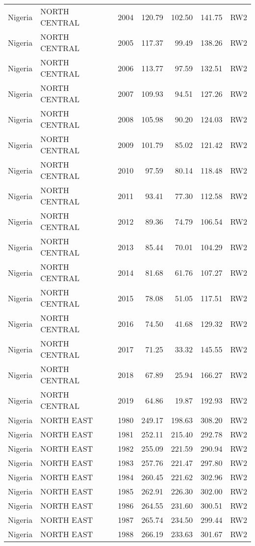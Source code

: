 \begin{longtable}{lllrrrl}
  Nigeria & NORTH CENTRAL & 2004 & 120.79 & 102.50 & 141.75 & RW2 \\ 
  Nigeria & NORTH CENTRAL & 2005 & 117.37 & 99.49 & 138.26 & RW2 \\ 
  Nigeria & NORTH CENTRAL & 2006 & 113.77 & 97.59 & 132.51 & RW2 \\ 
  Nigeria & NORTH CENTRAL & 2007 & 109.93 & 94.51 & 127.26 & RW2 \\ 
  Nigeria & NORTH CENTRAL & 2008 & 105.98 & 90.20 & 124.03 & RW2 \\ 
  Nigeria & NORTH CENTRAL & 2009 & 101.79 & 85.02 & 121.42 & RW2 \\ 
  Nigeria & NORTH CENTRAL & 2010 & 97.59 & 80.14 & 118.48 & RW2 \\ 
  Nigeria & NORTH CENTRAL & 2011 & 93.41 & 77.30 & 112.58 & RW2 \\ 
  Nigeria & NORTH CENTRAL & 2012 & 89.36 & 74.79 & 106.54 & RW2 \\ 
  Nigeria & NORTH CENTRAL & 2013 & 85.44 & 70.01 & 104.29 & RW2 \\ 
  Nigeria & NORTH CENTRAL & 2014 & 81.68 & 61.76 & 107.27 & RW2 \\ 
  Nigeria & NORTH CENTRAL & 2015 & 78.08 & 51.05 & 117.51 & RW2 \\ 
  Nigeria & NORTH CENTRAL & 2016 & 74.50 & 41.68 & 129.32 & RW2 \\ 
  Nigeria & NORTH CENTRAL & 2017 & 71.25 & 33.32 & 145.55 & RW2 \\ 
  Nigeria & NORTH CENTRAL & 2018 & 67.89 & 25.94 & 166.27 & RW2 \\ 
  Nigeria & NORTH CENTRAL & 2019 & 64.86 & 19.87 & 192.93 & RW2 \\ 
  Nigeria & NORTH EAST & 1980 & 249.17 & 198.63 & 308.20 & RW2 \\ 
  Nigeria & NORTH EAST & 1981 & 252.11 & 215.40 & 292.78 & RW2 \\ 
  Nigeria & NORTH EAST & 1982 & 255.09 & 221.59 & 290.94 & RW2 \\ 
  Nigeria & NORTH EAST & 1983 & 257.76 & 221.47 & 297.80 & RW2 \\ 
  Nigeria & NORTH EAST & 1984 & 260.45 & 221.62 & 302.96 & RW2 \\ 
  Nigeria & NORTH EAST & 1985 & 262.91 & 226.30 & 302.00 & RW2 \\ 
  Nigeria & NORTH EAST & 1986 & 264.55 & 231.60 & 300.51 & RW2 \\ 
  Nigeria & NORTH EAST & 1987 & 265.74 & 234.50 & 299.44 & RW2 \\ 
  Nigeria & NORTH EAST & 1988 & 266.19 & 233.63 & 301.67 & RW2 \\ 

\end{longtable}
